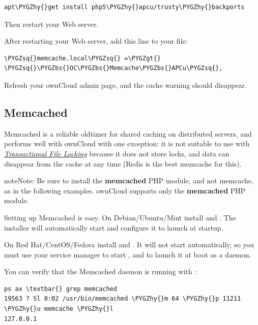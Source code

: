 \documentclass[letterpaper,10pt,english]{sphinxmanual}
\def\PYGZbs{\char`\\}
\def\PYGZgt{\char`\>}
\def\PYGZhy{\char`\-}
\def\PYGZsq{\char`\'}
\begin{document}
\begin{Verbatim}[commandchars=\\\{\}]
apt\PYGZhy{}get install php5\PYGZhy{}apcu/trusty\PYGZhy{}backports
\end{Verbatim}

Then restart your Web server.

After restarting your Web server, add this line to your  file:

\begin{Verbatim}[commandchars=\\\{\}]
\PYGZsq{}memcache.local\PYGZsq{} =\PYGZgt{} \PYGZsq{}\PYGZbs{}OC\PYGZbs{}Memcache\PYGZbs{}APCu\PYGZsq{},
\end{Verbatim}

Refresh your ownCloud admin page, and the cache warning should disappear.


\subsection{Memcached}
\label{configuration_server/caching_configuration:id2}
Memcached is a reliable oldtimer for shared caching on distributed servers,
and performs well with ownCloud with one exception: it is not suitable to use
with {\hyperref[configuration_files/files_locking_transactional::doc]{\emph{Transactional File Locking}}}
because it does not store locks, and data can disappear from the cache at any time
(Redis is the best memcache for this).

\begin{notice}{note}{Note:}
Be sure to install the \textbf{memcached} PHP module, and not memcache, as
in the following examples. ownCloud supports only the \textbf{memcached} PHP
module.
\end{notice}

Setting up Memcached is easy. On Debian/Ubuntu/Mint install  and
. The installer will automatically start  and
configure it to launch at startup.

On Red Hat/CentOS/Fedora install  and
. It will not start automatically, so you must use
your service manager to start , and to launch it at boot as a
daemon.

You can verify that the Memcached daemon is running with :

\begin{Verbatim}[commandchars=\\\{\}]
ps ax \textbar{} grep memcached
19563 ? Sl 0:02 /usr/bin/memcached \PYGZhy{}m 64 \PYGZhy{}p 11211 \PYGZhy{}u memcache \PYGZhy{}l
127.0.0.1
\end{Verbatim}
\end{document}
